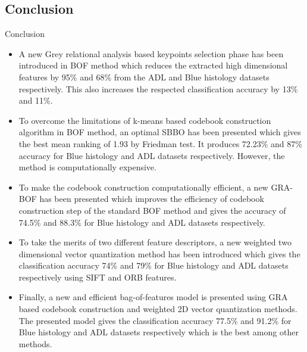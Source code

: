 \documentclass [9pt,times] {beamer}
\begin{document}
\subsection*{Conclusion}\label{concl}
\begin{frame}[allowframebreaks]{Conclusion}
\fontsize{9pt}{12pt}\selectfont
\begin{itemize}
\justifying
\item A new Grey relational analysis based keypoints selection phase has been introduced in BOF method which reduces the extracted high dimensional features by 95\% and 68\% from the ADL and Blue histology datasets respectively. This also increases the respected classification accuracy by 13\% and 11\%.\\[3ex]
	
	
\item To overcome the limitations of k-means based codebook construction algorithm in BOF method, an optimal SBBO has been presented which gives the best mean ranking of 1.93 by Friedman test. It produces 72.23\% and 87\% accuracy for Blue histology and ADL datasets respectively. However, the method is computationally expensive.\\[3ex]



\item To make the codebook construction computationally efficient, a new GRA-BOF has been presented which improves the efficiency of codebook construction step of the standard BOF method and gives the accuracy of 74.5\% and  88.3\% for Blue histology and ADL datasets respectively.
\\[3ex]

	
\item To take the merits of two different feature descriptors, a new weighted two dimensional vector quantization method has been introduced  which gives the classification accuracy 74\% and  79\% for Blue histology and ADL datasets respectively using SIFT and ORB features.\\[3ex]

\item Finally, a new and efficient bag-of-features model is presented using GRA based codebook construction and weighted 2D vector quantization methods. The presented model gives the classification accuracy 77.5\% and  91.2\% for Blue histology and ADL datasets respectively which is the best among other methods.

\end{itemize}
\end{frame}
\end{document}
